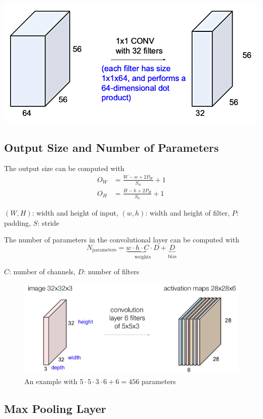 \documentclass[11pt]{article}
\begin{document}
\begin{center}
	\includegraphics[width=0.6\linewidth]{img/convolutional_layer_1x1_conv}
\end{center}

\subsection{Output Size and Number of Parameters}

The output size can be computed with
\begin{align*}
	O_W &= \frac{W-w+2P_W}{S_w} + 1\\
	O_H &= \frac{H-h+2P_H}{S_h} + 1
\end{align*}

$(W,H)$: width and height of input, $(w,h)$: width and height of filter, $P$: padding, $S$: stride

The number of parameters in the convolutional layer can be computed with
\begin{equation*}
	N_{\text{parameters}} = \underbrace{w\cdot h\cdot C\cdot D}_{\text{weights}} + \underbrace{D}_{\text{bias}}
\end{equation*}

$C$: number of channels, $D$: number of filters

\begin{figure}[htb]
	\centering
	\includegraphics[width=0.8\linewidth]{img/convolutional_layer_parameters_example}
	\caption{An example with $5\cdot5\cdot3\cdot6+6 = 456$ parameters}
	\label{fig:convolutionallayerparametersexample}
\end{figure}

\subsection{Max Pooling Layer}
\end{document}
